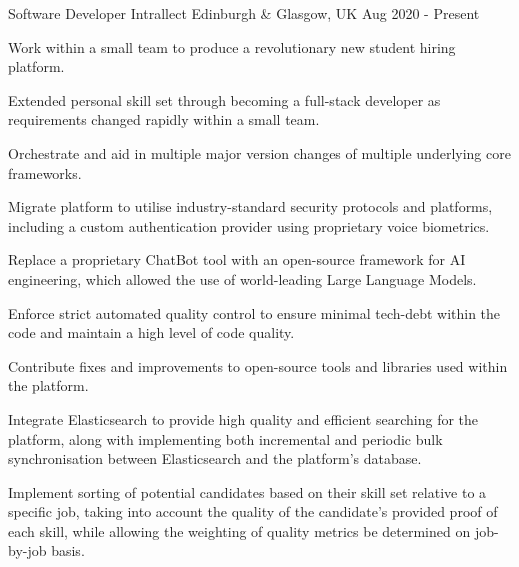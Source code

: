 

\begin{cventries}

    \cventry
    {Software Developer}
    {Intrallect}
    {Edinburgh \& Glasgow, UK}
    {Aug 2020 - Present}
    {
        \begin{cvitems}
            \item {Work within a small team to produce a revolutionary new student hiring platform.}
            \item {Extended personal skill set through becoming a full-stack developer as requirements changed rapidly within a small team.}
            \item {Orchestrate and aid in multiple major version changes of multiple underlying core frameworks.}
            \item {Migrate platform to utilise industry-standard security protocols and platforms, including a custom authentication provider using proprietary voice biometrics.}
            \item {Replace a proprietary ChatBot tool with an open-source framework for AI engineering, which allowed the use of world-leading Large Language Models.}
            \item {Enforce strict automated quality control to ensure minimal tech-debt within the code and maintain a high level of code quality.}
            \item {Contribute fixes and improvements to open-source tools and libraries used within the platform.}
            \item {Integrate Elasticsearch to provide high quality and efficient searching for the platform, along with implementing both incremental and periodic bulk synchronisation between Elasticsearch and the platform's database.}
            \item {Implement sorting of potential candidates based on their skill set relative to a specific job, taking into account the quality of the candidate's provided proof of each skill, while allowing the weighting of quality metrics be determined on job-by-job basis.}
        \end{cvitems}
    }


\end{cventries}
